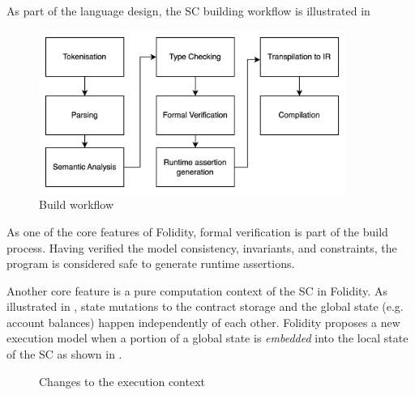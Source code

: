 \documentclass[oneside]{ecsproject}     %
\begin{document}
As part of the language design, the SC building workflow is illustrated in 

\begin{figure}[!htb]
  \centering
  \includegraphics[width=10cm]{compilation.png}
  \caption{Build workflow}
  \label{Figure:compilation}
\end{figure}

As one of the core features of Folidity, formal verification is part of the build process.
Having verified the model consistency, invariants, and constraints, the program is considered safe to generate runtime assertions.

Another core feature is a pure computation context of the SC in Folidity. As illustrated in ,
state mutations to the contract storage and the global state (e.g. account balances) happen independently of each other. 
Folidity proposes a new execution model when a portion of a global state is \textit{embedded} into the local state of the SC 
as shown in . 

\begin{figure}[!htb]
  \centering
  \caption{Changes to the execution context}
  \label{Figure:context}
\end{figure}
\end{document}

